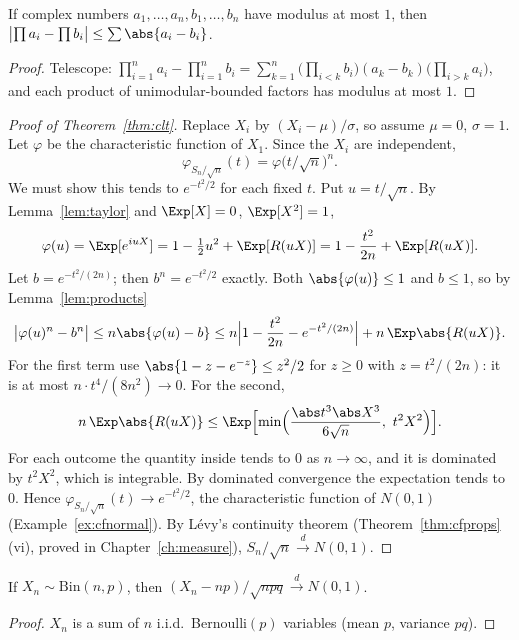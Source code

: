 \begin{lemma}[Products]\label{lem:products}
If complex numbers $a_1,\dots,a_n,b_1,\dots,b_n$ have modulus at most $1$, then
$\bigl\lvert\prod a_i-\prod b_i\bigr\rvert\le\sum\abs{a_i-b_i}$.
\end{lemma}
\begin{proof}
Telescope: $\prod_{i=1}^na_i-\prod_{i=1}^nb_i=\sum_{k=1}^n
\bigl(\prod_{i<k}b_i\bigr)(a_k-b_k)\bigl(\prod_{i>k}a_i\bigr)$, and each product of
unimodular-bounded factors has modulus at most $1$.
\end{proof}

\begin{proof}[Proof of Theorem~\ref{thm:clt}]
Replace $X_i$ by $(X_i-\mu)/\sigma$, so assume $\mu=0$, $\sigma=1$. Let $\varphi$ be the
characteristic function of $X_1$. Since the $X_i$ are independent,
\[
\varphi_{S_n/\sqrt n}(t)=\varphi\bigl(t/\sqrt n\bigr)^n .
\]
We must show this tends to $e^{-t^2/2}$ for each fixed $t$. Put $u=t/\sqrt n$. By
Lemma~\ref{lem:taylor} and $\Exp[X]=0$, $\Exp[X^2]=1$,
\[
\varphi(u)=\Exp[e^{iuX}]=1-\tfrac12u^2+\Exp[R(uX)]=1-\frac{t^2}{2n}+\Exp[R(uX)].
\]
Let $b=e^{-t^2/(2n)}$; then $b^n=e^{-t^2/2}$ exactly. Both $\abs{\varphi(u)}\le1$ and
$b\le1$, so by Lemma~\ref{lem:products}
\[
\bigl\lvert\varphi(u)^n-b^n\bigr\rvert\le n\abs{\varphi(u)-b}
\le n\Bigl\lvert1-\frac{t^2}{2n}-e^{-t^2/(2n)}\Bigr\rvert+n\,\Exp\abs{R(uX)}.
\]
For the first term use $\abs{1-z-e^{-z}}\le z^2/2$ for $z\ge0$ with $z=t^2/(2n)$: it is at
most $n\cdot t^4/(8n^2)\to0$. For the second,
\[
n\,\Exp\abs{R(uX)}\le\Exp\Bigl[\min\Bigl(\frac{\abs t^3\abs X^3}{6\sqrt n},\ t^2X^2\Bigr)\Bigr].
\]
For each outcome the quantity inside tends to $0$ as $n\to\infty$, and it is dominated
by $t^2X^2$, which is integrable. By dominated convergence the expectation tends to $0$.
Hence $\varphi_{S_n/\sqrt n}(t)\to e^{-t^2/2}$, the characteristic function of
$N(0,1)$ (Example~\ref{ex:cfnormal}). By L\'evy's continuity theorem
(Theorem~\ref{thm:cfprops}(vi), proved in Chapter~\ref{ch:measure}),
$S_n/\sqrt n\xrightarrow{d}N(0,1)$.
\end{proof}

\begin{corollary}
If $X_n\sim\mathrm{Bin}(n,p)$, then $(X_n-np)/\sqrt{npq}\xrightarrow{d}N(0,1)$.
\end{corollary}
\begin{proof}
$X_n$ is a sum of $n$ i.i.d.\ Bernoulli$(p)$ variables (mean $p$, variance $pq$).
\end{proof}

